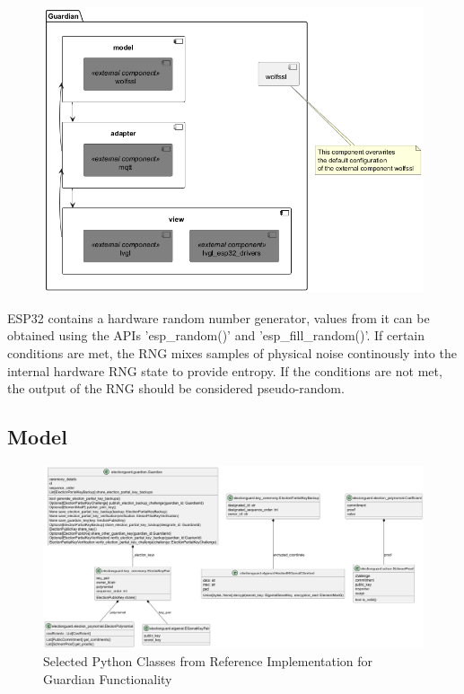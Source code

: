 \begin{figure}
	\centering
	\includegraphics[width=1\textwidth]{abbildungen/Diagramme/components.png}
	\caption{}
	\label{Fig:uml-classes-python}
\end{figure}



ESP32 contains a hardware random number generator, values from it can be obtained using the APIs 'esp_random()' and 'esp_fill_random()'. If certain conditions are met, the RNG mixes samples of physical noise continously into the internal hardware RNG state to provide entropy. If the conditions are not met, the output of the RNG should be considered pseudo-random. \cite[2140]{esp-idf}


\subsection{Model}
\begin{figure}
	\centering
	\includegraphics[width=1\textwidth]{abbildungen/Diagramme/python-classes.png}
	\caption{Selected Python Classes from Reference Implementation for Guardian Functionality}
	\label{Fig:uml-classes-python}
\end{figure}

